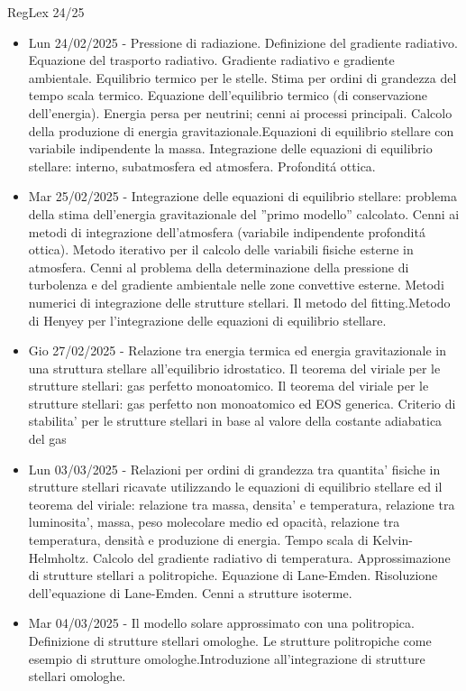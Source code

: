 \begin{frame}{RegLex 24/25}
\begin{itemize}
\item Lun 24/02/2025 - Pressione di radiazione. Definizione del gradiente radiativo. Equazione del trasporto radiativo. Gradiente radiativo e gradiente ambientale. Equilibrio termico per le stelle. Stima per ordini di grandezza del tempo scala termico. Equazione dell'equilibrio termico (di conservazione dell'energia). Energia persa per neutrini; cenni ai processi principali. Calcolo della produzione di energia gravitazionale.Equazioni di equilibrio stellare con variabile indipendente la massa. Integrazione delle equazioni di equilibrio stellare: interno, subatmosfera ed atmosfera. Profondit\'a ottica.
\item Mar 25/02/2025 - Integrazione delle equazioni di equilibrio stellare: problema della stima dell'energia gravitazionale del ''primo modello'' calcolato. Cenni ai metodi di integrazione dell'atmosfera (variabile indipendente profondit\'a ottica). Metodo iterativo per il calcolo delle variabili fisiche esterne in atmosfera. Cenni al problema della determinazione della pressione di turbolenza e del gradiente ambientale nelle zone convettive esterne. Metodi numerici di integrazione delle strutture stellari. Il metodo del fitting.Metodo di Henyey per l'integrazione delle equazioni di equilibrio stellare.
\item Gio 27/02/2025 - Relazione tra energia termica ed energia gravitazionale in una struttura stellare all'equilibrio idrostatico. Il teorema del viriale per le strutture stellari: gas perfetto monoatomico. Il teorema del viriale per le strutture stellari: gas perfetto non monoatomico ed EOS generica. Criterio di stabilita' per le strutture stellari in base al valore della costante adiabatica del gas
\item Lun 03/03/2025 - Relazioni per ordini di grandezza tra quantita' fisiche in strutture stellari ricavate utilizzando le equazioni di equilibrio stellare ed il teorema del viriale: relazione tra massa, densita' e temperatura, relazione tra luminosita', massa, peso molecolare medio ed opacità, relazione tra temperatura, densità e produzione di energia. Tempo scala di Kelvin-Helmholtz. Calcolo del gradiente radiativo di temperatura. Approssimazione di strutture stellari a politropiche. Equazione di Lane-Emden. Risoluzione dell'equazione di Lane-Emden. Cenni a strutture isoterme.
\item Mar 04/03/2025 - Il modello solare approssimato con una politropica. Definizione di strutture stellari omologhe. Le strutture politropiche come esempio di strutture omologhe.Introduzione all'integrazione di strutture stellari omologhe.

\end{itemize}
\end{frame}
